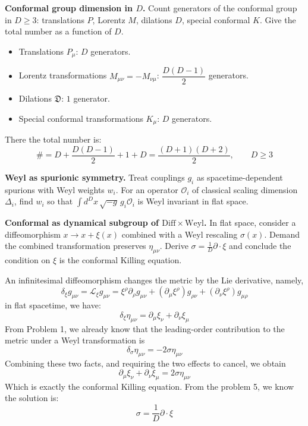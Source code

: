 \begin{problem}
    \textbf{Conformal group dimension in \(D\).} Count generators of the conformal group in \(D\ge 3\): translations \(P\), Lorentz \(M\), dilations \(D\), special conformal \(K\). Give the total number as a function of \(D\).
\end{problem}
\begin{solution}[27.5]
	\begin{itemize}
		\item Translations $P_\mu$: \;$D$ generators.
		\item Lorentz transformations $M_{\mu\nu}=-M_{\nu\mu}$: \;$\dfrac{D(D-1)}{2}$ generators.
		\item Dilations $\mathfrak{D}$: \;$1$ generator.
		\item Special conformal transformations $K_\mu$: \;$D$ generators.
	\end{itemize}
	There the total number is:
	\[
	\boxed{
	\#=D+\frac{D(D-1)}{2}+1+D=\frac{(D+1)(D+2)}{2},\qquad D\ge 3}
	\]
\end{solution}
\begin{problem}
    \textbf{Weyl as spurionic symmetry.} Treat couplings \(g_i\) as spacetime-dependent spurions with Weyl weights \(w_i\). For an operator \(\mathcal{O}_i\) of classical scaling dimension \(\Delta_i\), find \(w_i\) so that \(\int d^Dx\,\sqrt{-g}\,g_i\mathcal{O}_i\) is Weyl invariant in flat space.
\end{problem}
\begin{problem}
    \textbf{Conformal as dynamical subgroup of \(\mathrm{Diff}\times\mathrm{Weyl}\).} In flat space, consider a diffeomorphism \(x\to x+\xi(x)\) combined with a Weyl rescaling \(\sigma(x)\). Demand the combined transformation preserves \(\eta_{\mu\nu}\). Derive \(\sigma=\frac{1}{D}\partial\cdot\xi\) and conclude the condition on \(\xi\) is the conformal Killing equation.
\end{problem}
\begin{solution}[27.7]
	An infinitesimal diffeomorphism changes the metric by the Lie derivative, namely,
	\[
	\delta_\xi g_{\mu\nu}=\mathcal{L}_\xi g_{\mu\nu}=\xi^\rho\partial_\rho g_{\mu\nu}+(\partial_\mu\xi^\rho)g_{\rho\nu}+(\partial_\nu\xi^\rho)g_{\mu\rho}
	\]
	in flat spacetime, we have:
	\[
	\delta_\xi\eta_{\mu\nu}=\partial_\mu\xi_\nu+\partial_\nu\xi_\mu
	\]
	From Problem 1, we already know that the leading-order contribution to the metric under a Weyl transformation is
	\[
	\delta_\sigma\eta_{\mu\nu}=-2\sigma\eta_{\mu\nu}
	\]
	Combining these two facts, and requiring the two effects to cancel, we obtain
	\[
	\boxed{
		\partial_\mu\xi_\nu+\partial_\nu\xi_\mu=2\sigma\eta_{\mu\nu}
	}
	\]
	Which is exactly the conformal Killing equation. From the problem 5, we know the solution is:
	\[
	\boxed{
	\sigma=\frac{1}{D}\partial\cdot\xi
	}
	\]
\end{solution}
